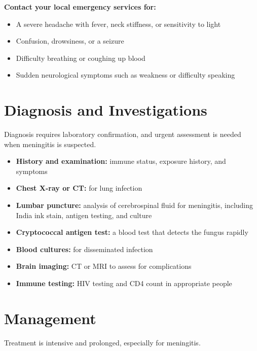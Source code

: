 \textbf{Contact your local emergency services for:}
\begin{itemize}
    \item A severe headache with fever, neck stiffness, or sensitivity to light
    \item Confusion, drowsiness, or a seizure
    \item Difficulty breathing or coughing up blood
    \item Sudden neurological symptoms such as weakness or difficulty speaking
\end{itemize}

\section*{Diagnosis and Investigations}
Diagnosis requires laboratory confirmation, and urgent assessment is needed when meningitis is suspected.

\begin{itemize}
    \item \textbf{History and examination:} immune status, exposure history, and symptoms
    \item \textbf{Chest X-ray or CT:} for lung infection
    \item \textbf{Lumbar puncture:} analysis of cerebrospinal fluid for meningitis, including India ink stain, antigen testing, and culture
    \item \textbf{Cryptococcal antigen test:} a blood test that detects the fungus rapidly
    \item \textbf{Blood cultures:} for disseminated infection
    \item \textbf{Brain imaging:} CT or MRI to assess for complications
    \item \textbf{Immune testing:} HIV testing and CD4 count in appropriate people
\end{itemize}

\section*{Management}
Treatment is intensive and prolonged, especially for meningitis.

